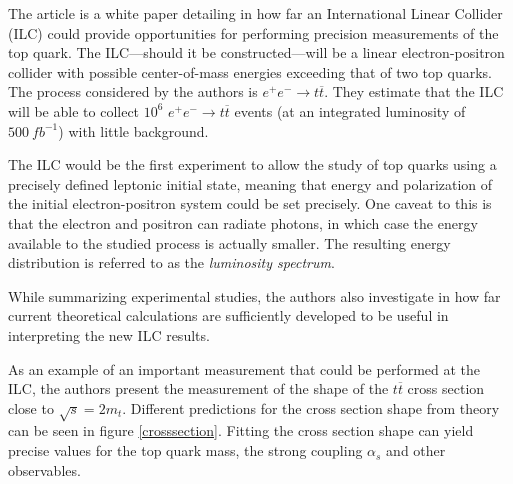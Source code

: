 

\captionsetup{width=0.45\textwidth}




The article\cite{ilc} is a white paper detailing in how far an International Linear Collider (ILC) could provide opportunities for performing precision measurements of the top quark.
The ILC—should it be constructed—will be a linear electron-positron collider with possible center-of-mass energies exceeding that of two top quarks.
The process considered by the authors is $e^+e^-\to t\overline{t}$.
They estimate that the ILC will be able to collect $10^6$ $e^+e^-\to t\overline{t}$ events (at an integrated luminosity of $\SI{500}{fb}^{-1}$) with little background.

The ILC would be the first experiment to allow the study of top quarks using a precisely defined leptonic initial state, meaning that energy and polarization of the initial electron-positron system could be set precisely.
One caveat to this is that the electron and positron can radiate photons, in which case the energy available to the studied process is actually smaller.
The resulting energy distribution is referred to as the \emph{luminosity spectrum}.

While summarizing experimental studies, the authors also investigate in how far current theoretical calculations are sufficiently developed to be useful in interpreting the new ILC results.

As an example of an important measurement that could be performed at the ILC, the authors present the measurement of the shape of the $t\overline{t}$ cross section close to $\sqrt{s} = 2 m_t$.
Different predictions for the cross section shape from theory can be seen in figure \ref{crosssection}.
Fitting the cross section shape can yield precise values for the top quark mass, the strong coupling $\alpha_s$ and other observables.

